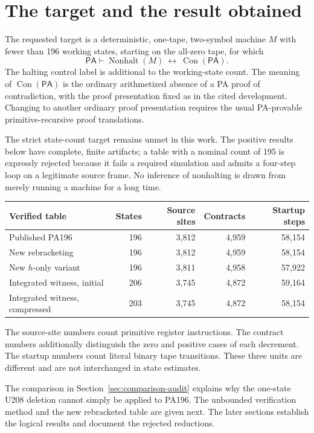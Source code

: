 \documentclass[11pt,letterpaper]{article}
\newcommand{\PA}{\mathsf{PA}}
\newcommand{\Con}{\operatorname{Con}}
\newcommand{\NH}{\operatorname{Nonhalt}}
\begin{document}
\section{The target and the result obtained}
The requested target is a deterministic, one-tape, two-symbol machine $M$
with fewer than 196 working states, starting on the all-zero tape, for which
\[
       \PA\vdash \NH(M)\ \longleftrightarrow\ \Con(\PA).
\]
The halting control label is additional to the working-state count. The
meaning of $\Con(\PA)$ is the ordinary arithmetized absence of a PA proof of
contradiction, with the proof presentation fixed as in the cited development.
Changing to another ordinary proof presentation requires the usual
PA-provable primitive-recursive proof translations.

The strict state-count target remains unmet in this work. The positive
results below have complete, finite artifacts; a table with a nominal count
of 195 is expressly rejected because it fails a required simulation and
admits a four-step loop on a legitimate source frame. No inference of
nonhalting is drawn from merely running a machine for a long time.

\begin{center}
\small
\begin{tabular}{@{}lrrrr@{}}
\toprule
Verified table & States & Source sites & Contracts & Startup steps\\
\midrule
Published PA196 &196&3,812&4,959&58,154\\
New rebracketing &196&3,812&4,959&58,154\\
New $h$-only variant &196&3,811&4,958&57,922\\
Integrated witness, initial &206&3,745&4,872&59,164\\
Integrated witness, compressed &203&3,745&4,872&58,154\\
\bottomrule
\end{tabular}
\end{center}
The source-site numbers count primitive register instructions. The contract
numbers additionally distinguish the zero and positive cases of each
decrement. The startup numbers count literal binary tape transitions.
These three units are different and are not interchanged in state estimates.

The comparison in Section~\ref{sec:comparison-audit} explains why the
one-state U208 deletion cannot simply be applied to PA196. The unbounded
verification method and the new rebracketed table are given next. The later
sections establish the logical results and document the rejected reductions.
\end{document}
